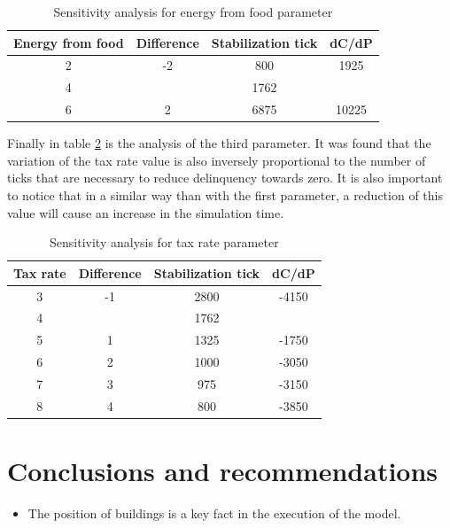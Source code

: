 \documentclass{wscpaperproc}
\begin{document}
\begin{table}[h!]
    \centering
    \begin{tabular}{|c|c|c|c|}
        \hline
        Energy from food & Difference & Stabilization tick &  dC/dP\\
        \hline
        2 & -2 & 800 & 1925\\
        \hline
        \rowcolor{lightgray}
        4 &      & 1762 & \\
        \hline
        6 & 2  & 6875 & 10225\\
        \hline
    \end{tabular}
    \caption{Sensitivity analysis for energy from food parameter}
    \label{table:energy}
\end{table}

Finally in table \ref{table:taxes} is the analysis of the third parameter. It
was found that the variation of the tax rate value is also inversely
proportional to the number of ticks that are necessary to reduce delinquency
towards zero. It is also important to notice that in a similar way than with
the first parameter, a reduction of this value will cause an increase in the
simulation time.\\

\begin{table}[h!]
    \centering
    \begin{tabular}{|c|c|c|c|}
        \hline
        Tax rate & Difference & Stabilization tick &  dC/dP\\
        \hline
        3 & -1 & 2800 & -4150\\
        \hline
        \rowcolor{lightgray}
        4 &    & 1762 & \\
        \hline
        5 & 1  & 1325 & -1750\\
        \hline
        6 & 2  & 1000 & -3050\\
        \hline
        7 & 3  & 975  & -3150\\
        \hline
        8 & 4  & 800  & -3850\\
        \hline
    \end{tabular}
    \caption{Sensitivity analysis for tax rate parameter}
    \label{table:taxes}
\end{table}

\section{Conclusions and recommendations}

\begin{itemize}
    \item The position of buildings is a key fact in the execution of the model.
\end{itemize}



\end{document}
